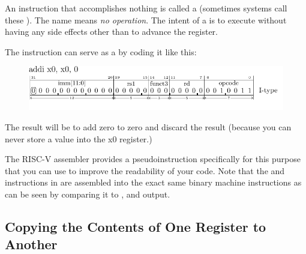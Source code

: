 An instruction that accomplishes nothing is called a 
(sometimes systems call these ).  The name means
{\em no operation}.
The intent of a  is to execute without having any side effects
other than to advance the  register.

The  instruction can serve as a  by coding it like this:

\begin{figure}[H]
    \includegraphics{figures/chapter04/IType-addi_x0_x0_0.pdf}
\end{figure}

The result will be to add zero to zero and discard the result (because you
can never store a value into the x0 register.)

The RISC-V assembler provides a pseudoinstruction specifically for this
purpose that you can use to improve the readability of your code.  Note
that the  and  instructions in 
are assembled into the exact same binary machine instructions
as can be seen by comparing it to
\verb@objdump@ {},
and \verb@rvddt@ {} output.






\subsection{Copying the Contents of One Register to Another}

